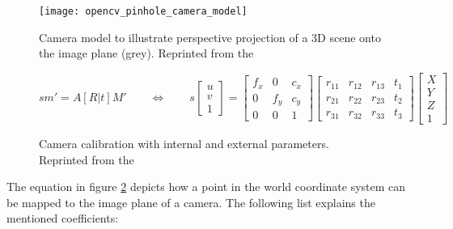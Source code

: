 \begin{figure}[hbt]
    \centering
    \texttt{[image: opencv\_pinhole\_camera\_model]}
        \caption{Camera model to illustrate perspective projection of a 3D scene onto the image plane (grey). Reprinted from the \textcite{opencv2018calibration}}
    \label{fig:sota:camerprojection}
\end{figure}

\begin{figure}[h!]
\centering
\begin{equation*}
    s m' = A[R|t]M'
    \hspace{2em}
    \Longleftrightarrow{}
    \hspace{2em}
    s 
    \begin{bmatrix}
        u \\
        v \\
        1
    \end{bmatrix}
    =
    \begin{bmatrix}
        f_x & 0 & c_x \\
        0 & f_y & c_y \\
        0 & 0 & 1
    \end{bmatrix}
    \begin{bmatrix}
        r_{11} & r_{12} & r_{13} & t_1 \\
        r_{21} & r_{22} & r_{23} & t_2 \\
        r_{31} & r_{32} & r_{33} & t_3
    \end{bmatrix}
    \begin{bmatrix}
        X \\
        Y \\
        Z \\
        1
    \end{bmatrix}
\end{equation*}
\caption{Camera calibration with internal and external parameters. Reprinted from the \textcite{opencv2018calibration}}
\label{eq:sota:camcalib}
\end{figure}

The equation in figure \ref{eq:sota:camcalib} depicts how a point in the world coordinate system can be mapped to the image plane of a camera. 
The following list explains the mentioned coefficients:

